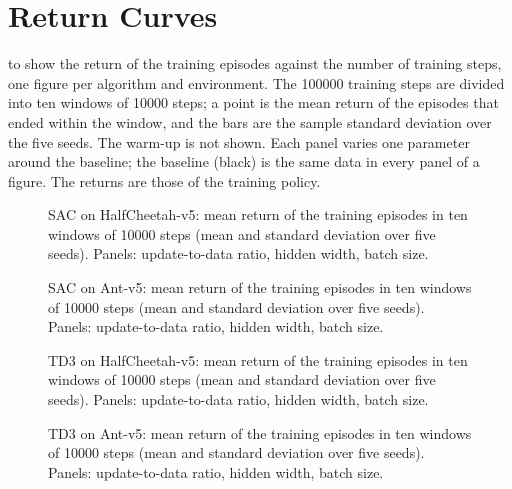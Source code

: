 \section{Return Curves}\label{sec:app-learn-curves}

 to  show the return of the training episodes against the number of training steps, one figure per algorithm and environment.
The \num{100000} training steps are divided into ten windows of \num{10000} steps; a point is the mean return of the episodes that ended within the window, and the bars are the sample standard deviation over the five seeds.
The warm-up is not shown.
Each panel varies one parameter around the baseline; the baseline (black) is the same data in every panel of a figure.
The returns are those of the training policy.

\begin{figure}[tbp]
  \centering
  
  \caption{SAC on HalfCheetah-v5: mean return of the training episodes in ten windows of \num{10000} steps (mean and standard deviation over five seeds). Panels: update-to-data ratio, hidden width, batch size.}
  \label{fig:app-return-sac-hc}
\end{figure}

\begin{figure}[tbp]
  \centering
  
  \caption{SAC on Ant-v5: mean return of the training episodes in ten windows of \num{10000} steps (mean and standard deviation over five seeds). Panels: update-to-data ratio, hidden width, batch size.}
  \label{fig:app-return-sac-ant}
\end{figure}

\begin{figure}[tbp]
  \centering
  
  \caption{TD3 on HalfCheetah-v5: mean return of the training episodes in ten windows of \num{10000} steps (mean and standard deviation over five seeds). Panels: update-to-data ratio, hidden width, batch size.}
  \label{fig:app-return-td3-hc}
\end{figure}

\begin{figure}[tbp]
  \centering
  
  \caption{TD3 on Ant-v5: mean return of the training episodes in ten windows of \num{10000} steps (mean and standard deviation over five seeds). Panels: update-to-data ratio, hidden width, batch size.}
  \label{fig:app-return-td3-ant}
\end{figure}

